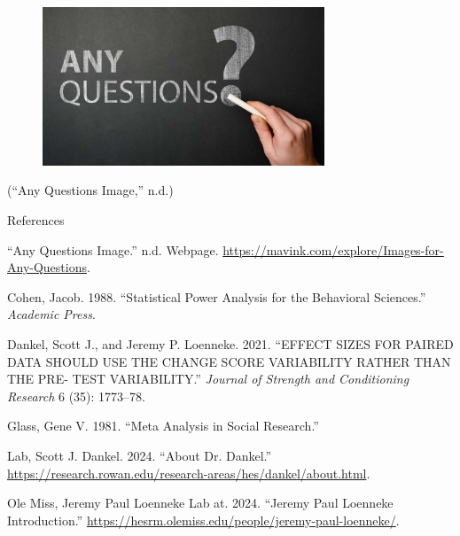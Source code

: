 \documentclass[
  ignorenonframetext,
  aspectratio=169,
]{beamer}
\newlength{\cslhangindent}
\newlength{\cslentryspacingunit} %
\newenvironment{CSLReferences}[2] %
 {%
  \setlength{\parindent}{0pt}
  \ifodd #1
  \let\oldpar\par
  \def\par{\hangindent=\cslhangindent\oldpar}
  \fi
  \setlength{\parskip}{#2\cslentryspacingunit}
 }%
 {}
\begin{document}
\begin{frame}{}
\protect\hypertarget{section}{}
\begin{figure}
\centering
\includegraphics[width=0.75\textwidth]{any-questions.jpeg}
\end{figure}

({``Any Questions Image,''} n.d.)
\end{frame}

\begin{frame}{References}
\protect\hypertarget{references}{}
\hypertarget{refs}{}
\begin{CSLReferences}{1}{0}
\leavevmode{}%
{``Any Questions Image.''} n.d. Webpage.
\url{https://mavink.com/explore/Images-for-Any-Questions}.

\leavevmode{}%
Cohen, Jacob. 1988. {``Statistical Power Analysis for the Behavioral
Sciences.''} \emph{Academic Press}.

\leavevmode{}%
Dankel, Scott J., and Jeremy P. Loenneke. 2021. {``EFFECT SIZES FOR
PAIRED DATA SHOULD USE THE CHANGE SCORE VARIABILITY RATHER THAN THE PRE-
TEST VARIABILITY.''} \emph{Journal of Strength and Conditioning
Research} 6 (35): 1773--78.

\leavevmode{}%
Glass, Gene V. 1981. {``Meta Analysis in Social Research.''}

\leavevmode{}%
Lab, Scott J. Dankel. 2024. {``About Dr. Dankel.''}
\url{https://research.rowan.edu/research-areas/hes/dankel/about.html}.

\leavevmode{}%
Ole Miss, Jeremy Paul Loenneke Lab at. 2024. {``Jeremy Paul Loenneke
Introduction.''}
\url{https://hesrm.olemiss.edu/people/jeremy-paul-loenneke/}.

\end{CSLReferences}
\end{frame}
\end{document}
